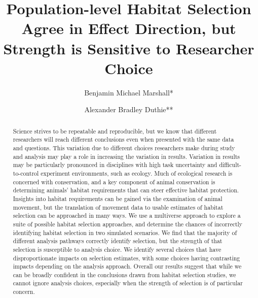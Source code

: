 \documentclass[10pt,a4paper]{article}
\begin{document}
\pagestyle{fancy}

\title{Population-level Habitat Selection Agree in Effect Direction, but Strength is Sensitive to Researcher Choice}
\author[1]{Benjamin Michael Marshall*}
\author[1]{Alexander Bradley Duthie**}


\maketitle
\thispagestyle{fancy}

\begin{abstract}

Science strives to be repeatable and reproducible, but we know that different researchers will reach different conclusions even when presented with the same data and questions. This variation due to different choices researchers make during study and analysis may play a role in increasing the variation in results. Variation in results may be particularly pronounced in disciplines with high task uncertainty and difficult-to-control experiment environments, such as ecology. Much of ecological research is concerned with conservation, and a key component of animal conservation is determining animals' habitat requirements that can steer effective habitat protection. Insights into habitat requirements can be gained via the examination of animal movement, but the translation of movement data to usable estimates of habitat selection can be approached in many ways. We use a multiverse approach to explore a suite of possible habitat selection approaches, and determine the chances of incorrectly identifying habitat selection in two simulated scenarios. We find that the majority of different analysis pathways correctly identify selection, but the strength of that selection is susceptible to analysis choice. We identify several choices that have disproportionate impacts on selection estimates, with some choices having contrasting impacts depending on the analysis approach. Overall our results suggest that while we can be broadly confident in the conclusions drawn from habitat selection studies, we cannot ignore analysis choices, especially when the strength of selection is of particular concern.

\end{abstract}
\end{document}

